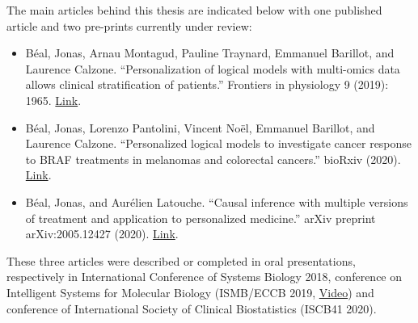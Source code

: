 \documentclass[a4paper,12pt,twoside,onecolumn,openright,final,oldfontcommands]{memoir}
\providecommand{\tightlist}{%
  \setlength{\itemsep}{0pt}\setlength{\parskip}{0pt}}
\newcommand{\clearemptydoublepage}{\newpage{\thispagestyle{empty}\cleardoublepage}}
\begin{document}
The main articles behind this thesis are indicated below with one
published article and two pre-prints currently under review:

\begin{itemize}
\tightlist
\item
  Béal, Jonas, Arnau Montagud, Pauline Traynard, Emmanuel Barillot, and
  Laurence Calzone. ``Personalization of logical models with multi-omics
  data allows clinical stratification of patients.'' Frontiers in
  physiology 9 (2019): 1965.
  \href{https://www.frontiersin.org/articles/10.3389/fphys.2018.01965/full}{Link}.
\item
  Béal, Jonas, Lorenzo Pantolini, Vincent Noël, Emmanuel Barillot, and
  Laurence Calzone. ``Personalized logical models to investigate cancer
  response to BRAF treatments in melanomas and colorectal cancers.''
  bioRxiv (2020).
  \href{https://www.biorxiv.org/content/10.1101/2020.05.27.119016v2}{Link}.
\item
  Béal, Jonas, and Aurélien Latouche. ``Causal inference with multiple
  versions of treatment and application to personalized medicine.''
  arXiv preprint arXiv:2005.12427 (2020).
  \href{https://arxiv.org/abs/2005.12427}{Link}.
\end{itemize}

These three articles were described or completed in oral presentations,
respectively in International Conference of Systems Biology 2018,
conference on Intelligent Systems for Molecular Biology (ISMB/ECCB 2019,
\href{https://www.youtube.com/watch?v=6EMBycoR0Ow}{Video}) and
conference of International Society of Clinical Biostatistics (ISCB41
2020).

\clearemptydoublepage

\renewcommand{\contentsname}{Table of contents}


\tableofcontents*
{}
\newpage

\listoftables
{}
\newpage

\listoffigures
{}
\newpage
\end{document}
